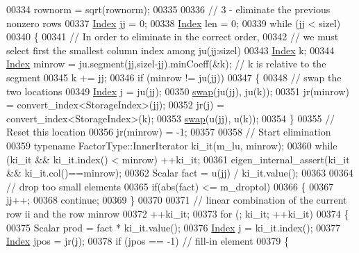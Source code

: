 \begin{DoxyCode}
00334     rownorm = sqrt(rownorm);
00335 
00336     \textcolor{comment}{// 3 - eliminate the previous nonzero rows}
00337     \hyperlink{namespace_eigen_a62e77e0933482dafde8fe197d9a2cfde}{Index} jj = 0;
00338     \hyperlink{namespace_eigen_a62e77e0933482dafde8fe197d9a2cfde}{Index} len = 0;
00339     \textcolor{keywordflow}{while} (jj < sizel)
00340     \{
00341       \textcolor{comment}{// In order to eliminate in the correct order,}
00342       \textcolor{comment}{// we must select first the smallest column index among  ju(jj:sizel)}
00343       \hyperlink{namespace_eigen_a62e77e0933482dafde8fe197d9a2cfde}{Index} k;
00344       \hyperlink{namespace_eigen_a62e77e0933482dafde8fe197d9a2cfde}{Index} minrow = ju.segment(jj,sizel-jj).minCoeff(&k); \textcolor{comment}{// k is relative to the segment}
00345       k += jj;
00346       \textcolor{keywordflow}{if} (minrow != ju(jj))
00347       \{
00348         \textcolor{comment}{// swap the two locations}
00349         \hyperlink{namespace_eigen_a62e77e0933482dafde8fe197d9a2cfde}{Index} j = ju(jj);
00350         \hyperlink{endian_8c_a3ca5ecd34b04d6a243c054ac3a57f68d}{swap}(ju(jj), ju(k));
00351         jr(minrow) = convert\_index<StorageIndex>(jj);
00352         jr(j) = convert\_index<StorageIndex>(k);
00353         \hyperlink{endian_8c_a3ca5ecd34b04d6a243c054ac3a57f68d}{swap}(u(jj), u(k));
00354       \}
00355       \textcolor{comment}{// Reset this location}
00356       jr(minrow) = -1;
00357 
00358       \textcolor{comment}{// Start elimination}
00359       \textcolor{keyword}{typename} FactorType::InnerIterator ki\_it(m\_lu, minrow);
00360       \textcolor{keywordflow}{while} (ki\_it && ki\_it.index() < minrow) ++ki\_it;
00361       eigen\_internal\_assert(ki\_it && ki\_it.col()==minrow);
00362       Scalar fact = u(jj) / ki\_it.value();
00363 
00364       \textcolor{comment}{// drop too small elements}
00365       \textcolor{keywordflow}{if}(abs(fact) <= m\_droptol)
00366       \{
00367         jj++;
00368         \textcolor{keywordflow}{continue};
00369       \}
00370 
00371       \textcolor{comment}{// linear combination of the current row ii and the row minrow}
00372       ++ki\_it;
00373       \textcolor{keywordflow}{for} (; ki\_it; ++ki\_it)
00374       \{
00375         Scalar prod = fact * ki\_it.value();
00376         \hyperlink{namespace_eigen_a62e77e0933482dafde8fe197d9a2cfde}{Index} j     = ki\_it.index();
00377         \hyperlink{namespace_eigen_a62e77e0933482dafde8fe197d9a2cfde}{Index} jpos  = jr(j);
00378         \textcolor{keywordflow}{if} (jpos == -1) \textcolor{comment}{// fill-in element}
00379         \{

\end{DoxyCode}
